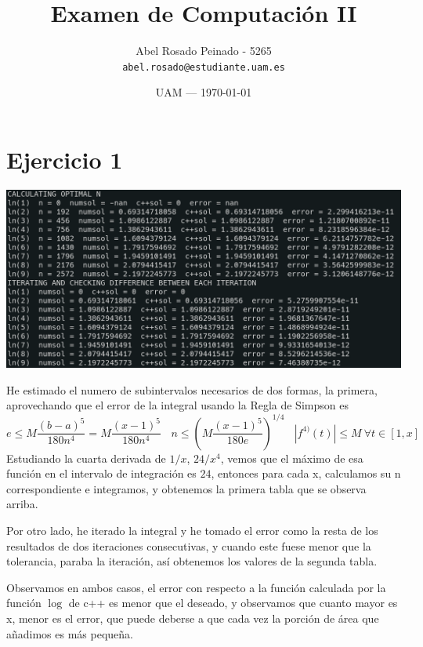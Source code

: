 \documentclass{article}
\title{Examen de Computación II} %
\author{Abel Rosado Peinado - 5265\\ \texttt{abel.rosado@estudiante.uam.es}} %
\date{UAM --- \today} %
\begin{document}
\maketitle %

\section*{Ejercicio 1}
\includegraphics[width=15.5cm]{ln.png}

He estimado el numero de subintervalos necesarios de dos formas, la primera, aprovechando que el error de la integral usando la Regla de Simpson es 
\[e \leq M\frac{(b-a)^5}{180 n^4} = M\frac{(x-1)^5}{180 n^4} \ \ \ \ n \leq \left( M \frac{(x-1)^5}{180 e} \right)^{1/4} \ \  \ \ |f^{4)}(t)| \leq M \ \forall t \in [1,x]\]
Estudiando la cuarta derivada de $1/x$, $24/x^4$, vemos que el máximo de esa función en el intervalo de integración es $24$, entonces para cada x, calculamos su n correspondiente e integramos, y obtenemos la primera tabla que se observa arriba.

Por otro lado, he iterado la integral y he tomado el error como la resta de los resultados de dos iteraciones consecutivas, y cuando este fuese menor que la tolerancia, paraba la iteración, así obtenemos los valores de la segunda tabla.

Observamos en ambos casos, el error con respecto a la función calculada por la función $\log$ de c++ es menor que el deseado, y observamos que cuanto mayor es x, menor es el error, que puede deberse a que cada vez la porción de área que añadimos es más pequeña.

\newpage
\end{document}
